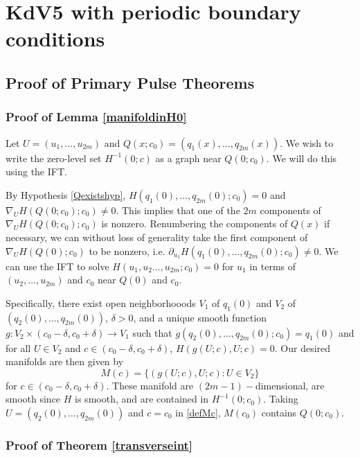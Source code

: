 \documentclass[thesis.tex]{subfiles}
\begin{document}
\iffulldocument\else
	\chapter{KdV5 with periodic boundary conditions}
\fi

\section{Proof of Primary Pulse Theorems}

\subsection{Proof of Lemma \ref{manifoldinH0}}

Let $U = (u_1, \dots, u_{2m})$ and $Q(x; c_0) = (q_1(x), \dots, q_{2m}(x))$. We wish to write the zero-level set $H^{-1}(0; c)$ as a graph near $Q(0; c_0)$. We will do this using the IFT.

By Hypothesis \ref{Qexistshyp}, $H(q_1(0), \dots, q_{2m}(0); c_0) = 0$ and $\nabla_U H(Q(0; c_0); c_0) \neq 0$. This implies that one of the $2m$ components of $\nabla_U H(Q(0; c_0); c_0)$ is nonzero. Renumbering the components of $Q(x)$ if necessary, we can without loss of generality take the first component of $\nabla_U H(Q(0); c_0)$ to be nonzero, i.e. $\partial_{u_1}H(q_1(0), \dots, q_{2m}(0); c_0) \neq 0$. We can use the IFT to solve $H(u_1, u_2 \dots, u_{2m}; c_0) = 0$ for $u_1$ in terms of $(u_2, \dots, u_{2m})$ and $c_0$ near $Q(0)$ and $c_0$.

Specifically, there exist open neighborhooods $V_1$ of $q_1(0)$ and $V_2$ of $(q_2(0), \dots, q_{2m}(0))$, $\delta > 0$, and a unique smooth function $g: V_2 \times (c_0 - \delta, c_0 + \delta) \rightarrow V_1$ such that $g(q_2(0), \dots, q_{2m}(0); c_0) = q_1(0)$ and for all $U \in V_2$ and $c \in (c_0 - \delta, c_0 + \delta)$, $H(g(U; c),U; c) = 0$. Our desired manifolds are then given by
\begin{equation}\label{defMc}
M(c) = \{ (g(U; c), U; c) : U \in V_2 \}
\end{equation}
for $c \in (c_0 - \delta, c_0 + \delta)$. These manifold are $(2m-1)-$dimensional, are smooth since $H$ is smooth, and are contained in $H^{-1}(0; c_0)$. Taking $U = (q_2(0), \dots, q_{2m}(0))$ and $c = c_0$ in \eqref{defMc}, $M(c_0)$ contains $Q(0; c_0)$.

\subsection{Proof of Theorem \ref{transverseint}}
\end{document}
